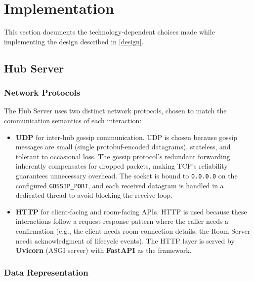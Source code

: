 \section{Implementation}\label{implementation}

This section documents the technology-dependent choices made while implementing the design described in \cref{design}.

\subsection{Hub Server}\label{implementation-hub}

\subsubsection{Network Protocols}

The Hub Server uses two distinct network protocols, chosen to match the communication semantics of each interaction:

\begin{itemize}
  \item \textbf{UDP} for inter-hub gossip communication. UDP is chosen because gossip messages are small (single protobuf-encoded datagrams), stateless, and tolerant to occasional loss. The gossip protocol's redundant forwarding inherently compensates for dropped packets, making TCP's reliability guarantees unnecessary overhead. The socket is bound to \texttt{0.0.0.0} on the configured \texttt{GOSSIP\_PORT}, and each received datagram is handled in a dedicated thread to avoid blocking the receive loop.

  \item \textbf{HTTP} for client-facing and room-facing APIs. HTTP is used because these interactions follow a request-response pattern where the caller needs a confirmation (e.g., the client needs room connection details, the Room Server needs acknowledgment of lifecycle events). The HTTP layer is served by \textbf{Uvicorn} \cite{uvicorn} (ASGI server) with \textbf{FastAPI} \cite{fastapi} as the framework.
\end{itemize}

\subsubsection{Data Representation}

